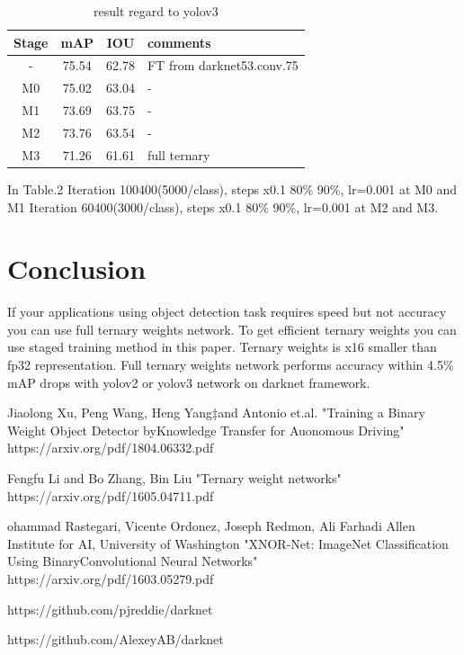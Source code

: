 \documentclass[twocolumn]{article}
\begin{document}
\begin{table}[htbp]
 \centering
 \begin{tabular}{c|c|c|l}
  Stage & mAP & IOU & comments \\ \hline\hline
  -        & 75.54 & 62.78 & FT from darknet53.conv.75 \\ \hline
  M0       & 75.02 & 63.04 & -                \\ \hline
  M1       & 73.69 & 63.75 & -                \\ \hline
  M2       & 73.76 & 63.54 & -                \\ \hline
  M3       & 71.26 & 61.61 & full ternary     \\ \hline\hline
 \end{tabular}
 \caption{result regard to yolov3}
 \label{tb:yolov3}
\end{table}

In Table.2 Iteration 100400(5000/class), steps x0.1 80\% 90\%, lr=0.001 at M0 and M1
Iteration 60400(3000/class), steps x0.1 80\% 90\%, lr=0.001 at M2 and M3.

\section{Conclusion}

If your applications using object detection task requires speed but not accuracy you can use full ternary weights network.
To get efficient ternary weights you can use staged training method in this paper.
Ternary weights is x16 smaller than fp32 representation.
Full ternary weights network performs accuracy within 4.5\% mAP drops with yolov2 or yolov3 network on darknet framework.

\begin{thebibliography}{99}
 \item Jiaolong Xu, Peng Wang, Heng Yang‡and Antonio et.al.
 "Training a Binary Weight Object Detector byKnowledge Transfer for Auonomous Driving" https://arxiv.org/pdf/1804.06332.pdf
 \item Fengfu Li and Bo Zhang, Bin Liu "Ternary weight networks" https://arxiv.org/pdf/1605.04711.pdf
 \item ohammad Rastegari, Vicente Ordonez, Joseph Redmon, Ali Farhadi Allen Institute for AI, University of Washington
 "XNOR-Net: ImageNet Classification Using BinaryConvolutional Neural Networks" https://arxiv.org/pdf/1603.05279.pdf
 \item https://github.com/pjreddie/darknet
 \item https://github.com/AlexeyAB/darknet

\end{thebibliography}
\end{document}

